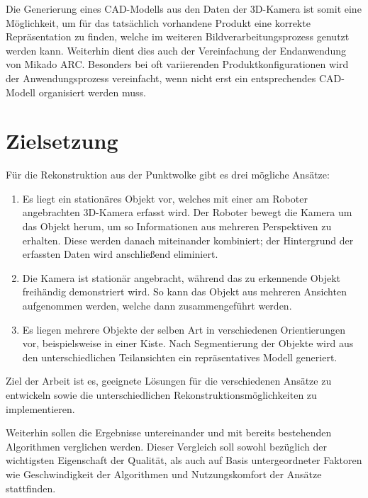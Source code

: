 Die Generierung eines CAD-Modells aus den Daten der 3D-Kamera ist somit eine Möglichkeit, um für das tatsächlich vorhandene Produkt eine korrekte Repräsentation zu finden, welche im weiteren Bildverarbeitungsprozess genutzt werden kann.
Weiterhin dient dies auch der Vereinfachung der Endanwendung von Mikado ARC.
Besonders bei oft variierenden Produktkonfigurationen wird der Anwendungsprozess vereinfacht, wenn nicht erst ein entsprechendes CAD-Modell organisiert werden muss.


\section{Zielsetzung}
\label{sec:ziel}

Für die Rekonstruktion aus der Punktwolke gibt es drei mögliche Ansätze:

\begin{enumerate}
\item Es liegt ein stationäres Objekt vor, welches mit einer am Roboter angebrachten 3D-Kamera erfasst wird.
Der Roboter bewegt die Kamera um das Objekt herum, um so Informationen aus mehreren Perspektiven zu erhalten.
Diese werden danach miteinander kombiniert; der Hintergrund der erfassten Daten wird anschließend eliminiert.

\item Die Kamera ist stationär angebracht, während das zu erkennende Objekt freihändig demonstriert wird.
So kann das Objekt aus mehreren Ansichten aufgenommen werden, welche dann zusammengeführt werden.

\item Es liegen mehrere Objekte der selben Art in verschiedenen Orientierungen vor, beispielsweise in einer Kiste.
Nach Segmentierung der Objekte wird aus den unterschiedlichen Teilansichten ein repräsentatives Modell generiert.
\end{enumerate}


Ziel der Arbeit ist es, geeignete Lösungen für die verschiedenen Ansätze zu entwickeln sowie die unterschiedlichen Rekonstruktionsmöglichkeiten zu implementieren.

Weiterhin sollen die Ergebnisse untereinander und mit bereits bestehenden Algorithmen verglichen werden.
Dieser Vergleich soll sowohl bezüglich der wichtigsten Eigenschaft der Qualität, als auch auf Basis untergeordneter Faktoren wie Geschwindigkeit der Algorithmen und Nutzungskomfort der Ansätze stattfinden.
